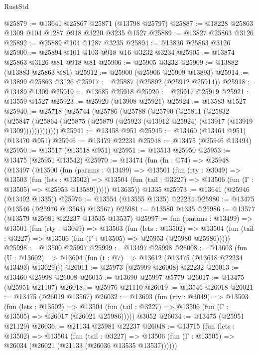 \begin{lexlean}{RustStd}
\begin{coremodule}
@25879 := @13641 @25867 @25871 (@13798 @25797)
@25887 := @18228 @25863 @1309 @104 @1287 @918 @3220 @3235 @1527
@25889 := @13827 @25863 @3126
@25892 := @25889 @104 @1287 @3235
@25894 := @13836 @25863 @3126
@25900 := @25894 @101 @103 @918 @16 @3232 @3234
@25905 := @13874 @25863 @3126 @81 @918 @81
@25906 := @25905 @3232
@25909 := @13882 (@13883 @25863 @81)
@25912 := @25900 (@25906 @25909 @13893)
@25914 := @13899 @25863 @3126
@25917 := @25887 (@25892 (@25912 @25914))
@25918 := @13489 @1309
@25919 := @13685 @25918
@25920 := @25917 @25919
@25921 := @13559 @1527
@25923 := @25920 (@13908 @25921)
@25924 := @13583 @1527
@25940 := @25718
    (@25744
      (@25786
        (@25788
          (@25790
            (@25811
              (@25832
                (@25847
                  (@25864 (@25875 (@25879 (@25923 (@13912 @25924) (@13917 (@13919 @1309)))))))))))))
@25941 := @13458 @951
@25945 := @13460 (@13464 @951) (@13470 @951)
@25946 := @13479 @22231
@25948 := @13475 (@25946 @13494)
@25950 := @13517 (@13518 @951)
@25951 := @13513 @25950
@25953 := @13475 (@25951 @13542)
@25970 := @13474
    (fun (fn : @74) =>
    @25948
      (@13497
        (@13500
          (fun (params : @13499) =>
          @13501
            (fun (rty : @3049) =>
            @13503
              (fun (lets : @13502) =>
              @13504 (fun (tail : @3227) => @13506 (fun (Γ : @13505) => @25953 @13589))))))
        @13635))
    @1335
@25973 := @13641 (@25946 (@13492 @1335))
@25976 := @13554 (@13555 @1335) @22234
@25980 := @13475 (@13546 (@25976 @13563) @13567)
@25981 := @13580 @1335
@25986 := @13577 (@13579 @25981 @22237 @13535 @13537)
@25997 := fun (params : @13499) =>
  @13501
    (fun (rty : @3049) =>
    @13503
      (fun (lets : @13502) =>
      @13504 (fun (tail : @3227) => @13506 (fun (Γ : @13505) => @25953 (@25980 @25986)))))
@25998 := @13500 @25997
@25999 := @13497 @25998
@26008 := @13603
    (fun (U : @13602) => @13604 (fun (t : @7) => @13612 (@13475 (@13618 @22234 @13493) @13629)))
@26011 := @25973 (@25999 @26008) @22232
@26013 := @13460 @25998 @26008
@26015 := @13690 @25997 @5779
@26017 := @13475 (@25951 @21107)
@26018 := @25976 @21110
@26019 := @13546 @26018
@26021 := @13475 (@26019 @13567)
@26032 := @13693
    (fun (rty : @3049) =>
    @13503
      (fun (lets : @13502) =>
      @13504 (fun (tail : @3227) => @13506 (fun (Γ : @13505) => @26017 (@26021 @25986)))))
    @3052
@26034 := @13475 (@25951 @21129)
@26036 := @21134 @25981 @22237
@26048 := @13715
    (fun (lets : @13502) =>
    @13504
      (fun (tail : @3227) =>
      @13506 (fun (Γ : @13505) => @26034 (@26021 (@21133 (@26036 @13535 @13537))))))

\end{coremodule}
\end{lexlean}
